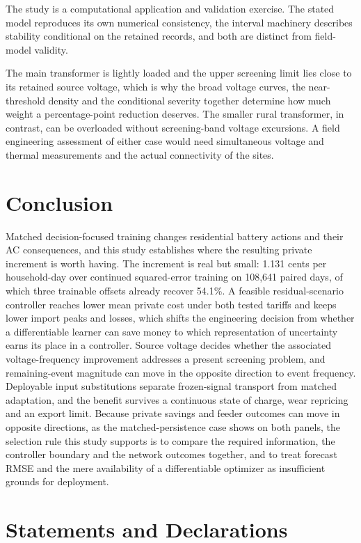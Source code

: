 \documentclass[pdflatex,Numbered,sn-basic]{sn-jnl}
\begin{document}
The study is a computational application and validation exercise. The stated model reproduces its own numerical consistency, the interval machinery describes stability conditional on the retained records, and both are distinct from field-model validity.

The main transformer is lightly loaded and the upper screening limit lies close to its retained source voltage, which is why the broad voltage curves, the near-threshold density and the conditional severity together determine how much weight a percentage-point reduction deserves. The smaller rural transformer, in contrast, can be overloaded without screening-band voltage excursions. A field engineering assessment of either case would need simultaneous voltage and thermal measurements and the actual connectivity of the sites.

\section{Conclusion}

Matched decision-focused training changes residential battery actions and their AC consequences, and this study establishes where the resulting private increment is worth having. The increment is real but small: 1.131 cents per household-day over continued squared-error training on 108,641 paired days, of which three trainable offsets already recover 54.1\%. A feasible residual-scenario controller reaches lower mean private cost under both tested tariffs and keeps lower import peaks and losses, which shifts the engineering decision from whether a differentiable learner can save money to which representation of uncertainty earns its place in a controller. Source voltage decides whether the associated voltage-frequency improvement addresses a present screening problem, and remaining-event magnitude can move in the opposite direction to event frequency. Deployable input substitutions separate frozen-signal transport from matched adaptation, and the benefit survives a continuous state of charge, wear repricing and an export limit. Because private savings and feeder outcomes can move in opposite directions, as the matched-persistence case shows on both panels, the selection rule this study supports is to compare the required information, the controller boundary and the network outcomes together, and to treat forecast RMSE and the mere availability of a differentiable optimizer as insufficient grounds for deployment.

\section*{Statements and Declarations}
\end{document}
